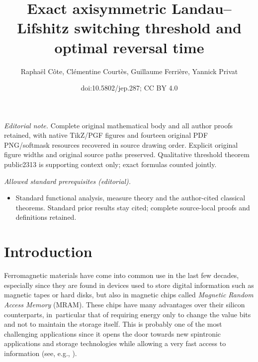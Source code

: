 \documentclass[10pt]{amsart}
\title{Exact axisymmetric Landau–Lifshitz switching threshold and optimal reversal time}
\author{Raphaël Côte, Clémentine Courtès, Guillaume Ferrière, Yannick Privat}
\date{doi:10.5802/jep.287; CC BY 4.0}
\theoremstyle{definition}
\begin{document}
\maketitle
\noindent\textit{Editorial note.} Complete original mathematical body and all author proofs retained, with native TikZ/PGF figures and fourteen original PDF PNG/softmask resources recovered in source drawing order. Explicit original figure widths and original source paths preserved. Qualitative threshold theorem public2313 is supporting context only; exact formulas counted jointly.\par\medskip
\noindent\textit{Allowed standard prerequisites (editorial).}\begin{itemize}
\item Standard functional analysis, measure theory and the author-cited classical theorems. Standard prior results stay cited; complete source-local proofs and definitions retained.
\end{itemize}\medskip
{\let\nobreakspace\xspace\tableofcontents}


\section{Introduction}
Ferromagnetic materials have come into common use in the last few decades, especially since they are found in devices used to store digital information such as magnetic tapes or hard disks, but also in magnetic chips called \emph{Magnetic Random Access Memory} (MRAM). These chips have many advantages over their silicon counterparts, in~particular that of requiring energy only to change the value bits and not to maintain the storage itself. This is probably one of the most challenging applications since it opens the door towards new spintronic applications and storage technologies while allowing a very fast access to information (see, e.g., \cite{parkin2008magnetic}).
\end{document}

